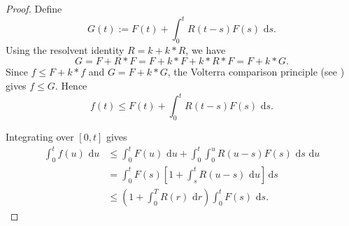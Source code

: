\documentclass[11pt]{article}
\theoremstyle{remarkitalic}
\theoremstyle{remarkitalic}
\newcommand{\dd}{\,\mathrm d}
\newcommand{\1}{\mathbf 1}
\begin{document}
\begin{proof}
Define
\[
    G(t)
    :=
    F(t)+\int_0^t R(t-s)F(s)\,\dd s.
\]
Using the resolvent identity $R=k+k*R$, we have
\[
    G=F+R*F=F+k*F+k*R*F=F+k*G.
\]
Since $f\le F+k*f$ and $G=F+k*G$, the Volterra comparison principle (see \cite{Beesack1969}) gives $f\le G$. Hence
\[
    f(t)
    \le
    F(t)+\int_0^t R(t-s)F(s)\,\dd s.
\]

Integrating over $[0,t]$ gives
\[
\begin{aligned}
    \int_0^t f(u)\,\dd u
    &\le
    \int_0^t F(u)\,\dd u
    +
    \int_0^t\int_0^u R(u-s)F(s)\,\dd s\,\dd u \\
    &=
    \int_0^t F(s)
    \left[
        1+\int_s^t R(u-s)\,\dd u
    \right]\dd s \\
    &\le
    \left(
        1+\int_0^T R(r)\,\dd r
    \right)
    \int_0^t F(s)\,\dd s.
\end{aligned}
\]
\end{proof}
\end{document}
